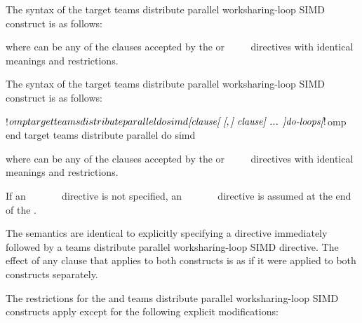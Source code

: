 \syntax
\begin{ccppspecific}
The syntax of the target teams distribute parallel worksharing-loop SIMD construct is as follows:

\begin{ompcPragma}
#pragma omp target teams distribute parallel for simd \plc{\}
            \plc{[clause[ [},\plc{] clause] ... ] new-line}
    \plc{for-loops}
\end{ompcPragma}

where  can be any of the clauses accepted by the  or
~~~~
directives with identical meanings and restrictions.
\end{ccppspecific}

\begin{fortranspecific}
The syntax of the target teams distribute parallel worksharing-loop SIMD construct is as follows:

\begin{ompfPragma}
!$omp target teams distribute parallel do simd \plc{[clause[ [},\plc{] clause] ... ]}
    \plc{do-loops}
\plc{[}!$omp end target teams distribute parallel do simd\plc{]}
\end{ompfPragma}

where  can be any of the clauses accepted by the
 or ~~~~
directives with identical meanings and restrictions.

If an ~~~~~~
directive is not specified, an
~~~~~~
directive is assumed at the end of the .
\end{fortranspecific}

\descr
The semantics are identical to explicitly specifying a 
directive immediately followed by a teams distribute parallel worksharing-loop
SIMD directive. The effect of any clause that applies to both constructs is as if it were applied to both constructs separately.


\restrictions
The restrictions for the  and teams distribute parallel
worksharing-loop SIMD constructs apply except for the following explicit modifications:

